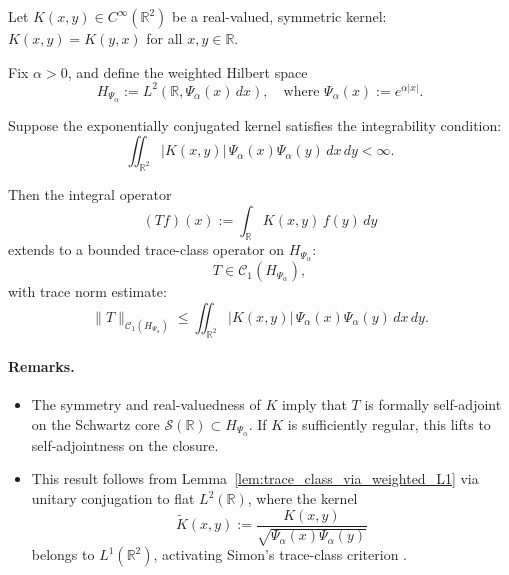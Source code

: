 \begin{lemma}
\label{lem:trace-class-conjugated-kernel}
Let \( K(x, y) \in C^\infty(\mathbb{R}^2) \) be a real-valued, symmetric kernel: \( K(x,y) = K(y,x) \) for all \( x,y \in \mathbb{R} \).

Fix \( \alpha > 0 \), and define the weighted Hilbert space
\[
H_{\Psi_\alpha} := L^2(\mathbb{R}, \Psi_\alpha(x)\, dx), \quad \text{where } \Psi_\alpha(x) := e^{\alpha |x|}.
\]

Suppose the exponentially conjugated kernel satisfies the integrability condition:
\[
\iint_{\mathbb{R}^2} |K(x, y)| \, \Psi_\alpha(x) \Psi_\alpha(y) \, dx\, dy < \infty.
\]

Then the integral operator
\[
(T f)(x) := \int_{\mathbb{R}} K(x, y)\, f(y)\, dy
\]
extends to a bounded trace-class operator on \( H_{\Psi_\alpha} \):
\[
T \in \mathcal{C}_1(H_{\Psi_\alpha}),
\]
with trace norm estimate:
\[
\| T \|_{\mathcal{C}_1(H_{\Psi_\alpha})}
\le \iint_{\mathbb{R}^2} |K(x, y)|\, \Psi_\alpha(x)\Psi_\alpha(y)\, dx\, dy.
\]

\paragraph{Remarks.}
\begin{itemize}
    \item The symmetry and real-valuedness of \( K \) imply that \( T \) is formally self-adjoint on the Schwartz core \( \mathcal{S}(\mathbb{R}) \subset H_{\Psi_\alpha} \). If \( K \) is sufficiently regular, this lifts to self-adjointness on the closure.
    
    \item This result follows from Lemma~\ref{lem:trace_class_via_weighted_L1} via unitary conjugation to flat \( L^2(\mathbb{R}) \), where the kernel
    \[
    \widetilde{K}(x,y) := \frac{K(x,y)}{\sqrt{\Psi_\alpha(x)\Psi_\alpha(y)}}
    \]
    belongs to \( L^1(\mathbb{R}^2) \), activating Simon's trace-class criterion \cite[Thm.~4.2]{Simon2005TraceIdeals}.
\end{itemize}
\end{lemma}
